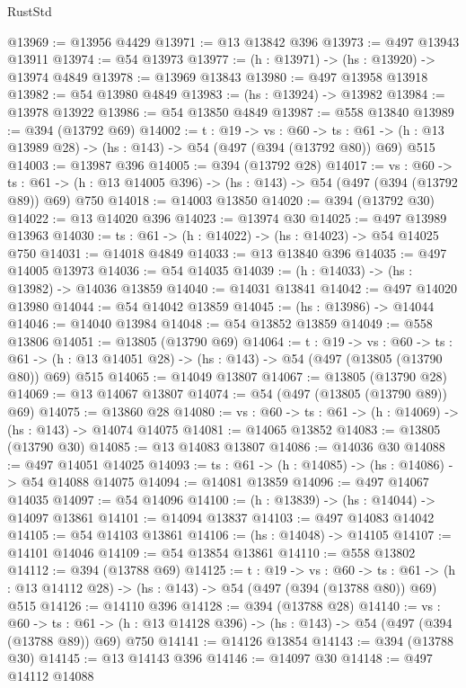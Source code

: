 \begin{lexlean}{RustStd}
\begin{coremodule}
@13969 := @13956 @4429
@13971 := @13 @13842 @396
@13973 := @497 @13943 @13911
@13974 := @54 @13973
@13977 := (h : @13971) -> (hs : @13920) -> @13974 @4849
@13978 := @13969 @13843
@13980 := @497 @13958 @13918
@13982 := @54 @13980 @4849
@13983 := (hs : @13924) -> @13982
@13984 := @13978 @13922
@13986 := @54 @13850 @4849
@13987 := @558 @13840
@13989 := @394 (@13792 @69)
@14002 := {t : @19} ->
  {vs : @60} ->
  {ts : @61} -> (h : @13 @13989 @28) -> (hs : @143) -> @54 (@497 (@394 (@13792 @80)) @69) @515
@14003 := @13987 @396
@14005 := @394 (@13792 @28)
@14017 := {vs : @60} ->
  {ts : @61} -> (h : @13 @14005 @396) -> (hs : @143) -> @54 (@497 (@394 (@13792 @89)) @69) @750
@14018 := @14003 @13850
@14020 := @394 (@13792 @30)
@14022 := @13 @14020 @396
@14023 := @13974 @30
@14025 := @497 @13989 @13963
@14030 := {ts : @61} -> (h : @14022) -> (hs : @14023) -> @54 @14025 @750
@14031 := @14018 @4849
@14033 := @13 @13840 @396
@14035 := @497 @14005 @13973
@14036 := @54 @14035
@14039 := (h : @14033) -> (hs : @13982) -> @14036 @13859
@14040 := @14031 @13841
@14042 := @497 @14020 @13980
@14044 := @54 @14042 @13859
@14045 := (hs : @13986) -> @14044
@14046 := @14040 @13984
@14048 := @54 @13852 @13859
@14049 := @558 @13806
@14051 := @13805 (@13790 @69)
@14064 := {t : @19} ->
  {vs : @60} ->
  {ts : @61} -> (h : @13 @14051 @28) -> (hs : @143) -> @54 (@497 (@13805 (@13790 @80)) @69) @515
@14065 := @14049 @13807
@14067 := @13805 (@13790 @28)
@14069 := @13 @14067 @13807
@14074 := @54 (@497 (@13805 (@13790 @89)) @69)
@14075 := @13860 @28
@14080 := {vs : @60} -> {ts : @61} -> (h : @14069) -> (hs : @143) -> @14074 @14075
@14081 := @14065 @13852
@14083 := @13805 (@13790 @30)
@14085 := @13 @14083 @13807
@14086 := @14036 @30
@14088 := @497 @14051 @14025
@14093 := {ts : @61} -> (h : @14085) -> (hs : @14086) -> @54 @14088 @14075
@14094 := @14081 @13859
@14096 := @497 @14067 @14035
@14097 := @54 @14096
@14100 := (h : @13839) -> (hs : @14044) -> @14097 @13861
@14101 := @14094 @13837
@14103 := @497 @14083 @14042
@14105 := @54 @14103 @13861
@14106 := (hs : @14048) -> @14105
@14107 := @14101 @14046
@14109 := @54 @13854 @13861
@14110 := @558 @13802
@14112 := @394 (@13788 @69)
@14125 := {t : @19} ->
  {vs : @60} ->
  {ts : @61} -> (h : @13 @14112 @28) -> (hs : @143) -> @54 (@497 (@394 (@13788 @80)) @69) @515
@14126 := @14110 @396
@14128 := @394 (@13788 @28)
@14140 := {vs : @60} ->
  {ts : @61} -> (h : @13 @14128 @396) -> (hs : @143) -> @54 (@497 (@394 (@13788 @89)) @69) @750
@14141 := @14126 @13854
@14143 := @394 (@13788 @30)
@14145 := @13 @14143 @396
@14146 := @14097 @30
@14148 := @497 @14112 @14088

\end{coremodule}
\end{lexlean}
